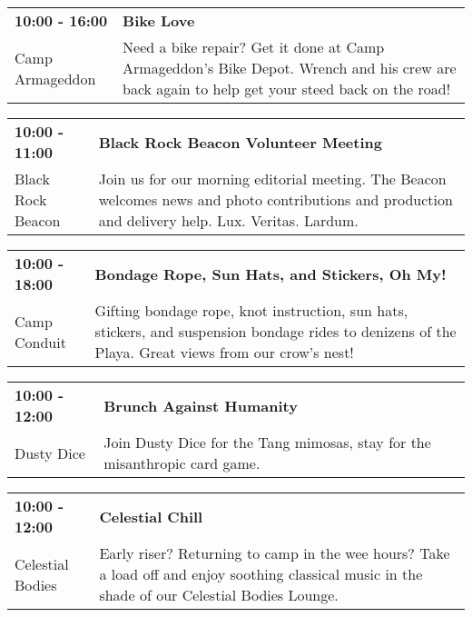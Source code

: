 \begin{tabular}{ p{1in} p{2.2in} }
    \textbf{10:00 - 16:00} & \textbf{Bike Love} \\
    Camp Armageddon \newline  & Need a bike repair? Get it done at Camp Armageddon's Bike Depot. Wrench and his crew are back again to help get your steed back on the road! \\
    \hline 
\end{tabular}
    
\begin{tabular}{ p{1in} p{2.2in} }
    \textbf{10:00 - 11:00} & \textbf{Black Rock Beacon Volunteer Meeting} \\
    Black Rock Beacon \newline  & Join us for our morning editorial meeting. The Beacon welcomes news and photo contributions and production and delivery help. Lux. Veritas. Lardum. \\
    \hline 
\end{tabular}
    
\begin{tabular}{ p{1in} p{2.2in} }
    \textbf{10:00 - 18:00} & \textbf{Bondage Rope, Sun Hats, and Stickers, Oh My!} \\
    Camp Conduit \newline  & Gifting bondage rope, knot instruction, sun hats, stickers, and suspension bondage rides to denizens of the Playa. Great views from our crow's nest! \\
    \hline 
\end{tabular}
    
\begin{tabular}{ p{1in} p{2.2in} }
    \textbf{10:00 - 12:00} & \textbf{Brunch Against Humanity} \\
    Dusty Dice \newline  & Join Dusty Dice for the Tang mimosas, stay for the misanthropic card game. \\
    \hline 
\end{tabular}
    
\begin{tabular}{ p{1in} p{2.2in} }
    \textbf{10:00 - 12:00} & \textbf{Celestial Chill} \\
    Celestial Bodies \newline  & Early riser? Returning to camp in the wee hours? Take a load off and enjoy soothing classical music in the shade of our Celestial Bodies Lounge. \\
    \hline 
\end{tabular}
    
